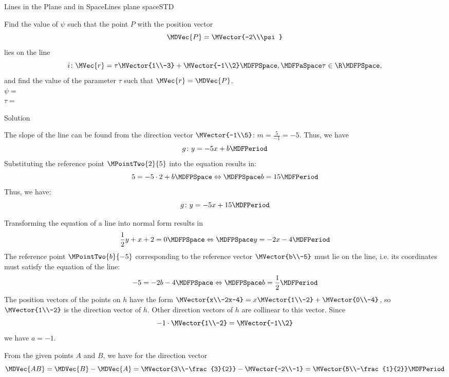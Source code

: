 \begin{MXContent}{Lines in the Plane and in Space}{Lines plane space}{STD}
\begin{MExercise}
\begin{MExerciseItems}
{
}
\item{Find the value of $\psi$ such that the point $P$ with the position vector
\[
 \MDVec{P}=\MVector{-2\\\psi}
\]
lies on the line
\[
 i\colon \MVec{r}=\tau\MVector{1\\-3}+\MVector{-1\\2}\MDFPSpace,\MDFPaSpace\tau\in\R \MDFPSpace ,
\]
and find the value of the parameter $\tau$ such that $\MVec{r}=\MDVec{P}$.\\
$\psi=$\\
$\tau=$
}
\end{MExerciseItems}

\begin{MHint}{Solution}
 \begin{MExerciseItems}
\item{%
The slope of the line can be found from the direction vector $\MVector{-1\\5}$: $m=\frac{5}{-1}=-5$. Thus, we have
\[
 g\colon y=-5x+b \MDFPeriod
\]
Substituting the reference point $\MPointTwo{2}{5}$ into the equation results in:
\[
 5=-5\cdot 2+b\MDFPSpace\Leftrightarrow\MDFPSpace b=15\MDFPeriod
\]
Thus, we have:
\[
 g\colon y=-5x+15\MDFPeriod
\]
}
\item{Transforming the equation of a line into normal form results in
\[
 \frac{1}{2}y+x+2=0\MDFPSpace\Leftrightarrow\MDFPSpace y=-2x-4 \MDFPeriod
\]
The reference point $\MPointTwo{b}{-5}$ corresponding to the reference vector $\MVector{b\\-5}$ must lie on the 
line, i.e. its coordinates must satisfy the equation of the line:
\[
 -5 = -2b-4\MDFPSpace\Leftrightarrow\MDFPSpace b=\frac{1}{2} \MDFPeriod
\]
The position vectors of the points on $h$ have the form $\MVector{x\\-2x-4}=x\MVector{1\\-2}+\MVector{0\\-4}$,
so $\MVector{1\\-2}$ is the direction vector of $h$. Other direction vectors of $h$ are collinear to 
this vector. Since
\[
 -1\cdot\MVector{1\\-2}=\MVector{-1\\2}
\]
we have $a=-1$.
}
\item{From the given points $A$ and $B$, we have for the direction vector
\[
 \MDVec{A B}=\MDVec{B}-\MDVec{A}=\MVector{3\\-\frac{3}{2}}-\MVector{-2\\-1}=\MVector{5\\-\frac{1}{2}} \MDFPeriod
\]}
\end{MExerciseItems}
\end{MHint}
\end{MExercise}
\end{MXContent}

